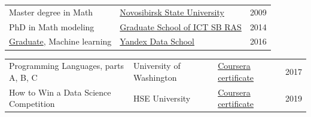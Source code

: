 \documentclass[11pt]{article}
\begin{document}
\vspace{-1.5em}
\vspace{-0.5em}
\begin{longtable} {p{}p{}l}
  Master degree in Math & \href{https://english.nsu.ru/}{Novosibirsk State University} &
	 2009	\vspace{0.5em}\\
  PhD in Math modeling & \href{http://www.ict.nsc.ru/ru/education/postgraduate}{Graduate School of ICT SB RAS} & 2014 \vspace{0.5em}\\
	\href{https://academy.yandex.ru/dataschool/graduates}{Graduate}, Machine learning & \href{https://academy.yandex.ru/dataschool/}{Yandex Data School} & 2016 \vspace{0.5em}\\
\end{longtable}
\vspace{-0.5em}
\vspace{-0.5em}
\begin{longtable}{p{}p{}ll}
Programming Languages, parts A, B, C &
University of Washington & \href{https://coursera.org/share/3e187e640ed6df57b0a84ecb8a82ddab}{ Coursera certificate }& 2017 \vspace{0.5em}\\
How to Win a Data Science Competition & HSE University & \href{https://coursera.org/share/0ad3f02a08a405800c29d5909caece90}{ Coursera certificate } & 2019 \vspace{0.5em}\\
\end{longtable}


\end{document}
